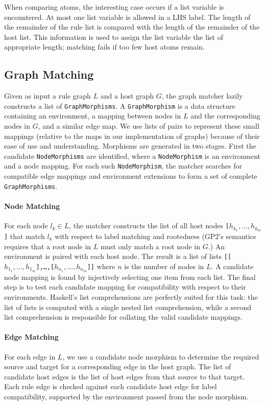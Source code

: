 When comparing atoms, the interesting case occurs if a list variable is encountered. At most one list variable is allowed in a LHS label. The length of the remainder of the rule list is compared with the length of the remainder of the host list. This information is used to assign the list variable the list of appropriate length; matching fails if too few host atoms remain.

\subsection{Graph Matching}\label{sec:graph-match}

Given as input a rule graph $L$ and a host graph $G$, the graph matcher lazily constructs a list of \texttt{GraphMorphisms}. A \texttt{GraphMorphism} is a data structure containing an environment, a mapping between nodes in $L$ and the corresponding nodes in $G$, and a similar edge map. We use lists of pairs to represent these small mappings (relative to the maps in our implementation of graphs) because of their ease of use and understanding.  Morphisms are generated in two stages. First the candidate \texttt{NodeMorphisms} are identified, where a \texttt{NodeMorphism} is an environment and a node mapping. For each such \texttt{NodeMorphism}, the matcher searches for compatible edge mappings and environment extensions to form a set of complete \texttt{GraphMorphisms}.

\paragraph{Node Matching}
For each node $l_k \in L$, the matcher constructs the list of all host nodes \texttt{[$h_{k_1}, \ldots, h_{k_m}$]} that match $l_k$ with respect to label matching and rootedness (GP2's semantics requires that a root node in $L$ must only match a root node in $G$.) An environment is paired with each host node. The result is a list of lists \texttt{[[$h_{1_1}, \ldots, h_{1_m}$],\ldots,[$h_{n_1}, \ldots, h_{n_m}$]]} where $n$ is the number of nodes in $L$. A candidate node mapping is found by injectively selecting one item from each list. The final step is to test each candidate mapping for compatibility with respect to their environments. Haskell's list comprehensions are perfectly suited for this task: the list of lists is computed with a single nested list comprehension, while a second list comprehension is responsible for collating the valid candidate mappings. 

\paragraph{Edge Matching} 
For each edge in $L$, we use a candidate node morphism to determine the required source and target for a corresponding edge in the host graph. The list of candidate host edges is the list of host edges from that source to that target. Each rule edge is checked against each candidate host edge for label compatibility, supported by the environment passed from the node morphism.

